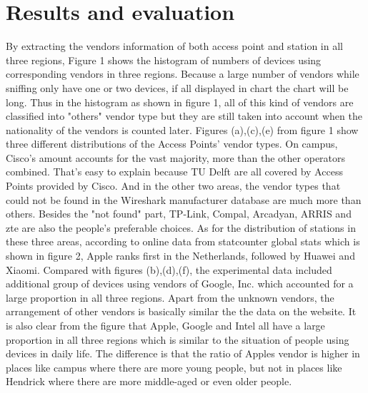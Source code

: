\section{Results and evaluation}

By extracting the vendors information of both access point and station in all three regions, Figure 1 shows the histogram of numbers of devices using corresponding vendors in three regions. Because a large number of vendors while sniffing only have one or two devices, if all displayed in chart the chart will be long. Thus in the histogram as shown in figure 1, all of this kind of vendors are classified into "others" vendor type but they are still taken into account when the nationality of the vendors is counted later.
\newline
Figures (a),(c),(e) from figure 1 show three different distributions of the Access Points' vendor types. On campus, Cisco's amount accounts for the vast majority, more than the other operators combined. That's easy to explain because TU Delft are all covered by Access Points provided by Cisco. And in the other two areas, the vendor types that could not be found in the Wireshark manufacturer database are much more than others. Besides the "not found" part, TP-Link, Compal, Arcadyan, ARRIS and zte are also the people's preferable choices.
\newline
As for the distribution of stations in these three areas,  according to online data from statcounter global stats which is shown in figure 2, Apple ranks first in the Netherlands, followed by Huawei and Xiaomi. Compared with figures (b),(d),(f), the experimental data included additional group of devices using vendors of Google, Inc. which accounted for a large proportion in all three regions. Apart from the unknown vendors, the arrangement of other vendors is basically similar the the data on the website. It is also clear from the figure that Apple, Google and Intel all have a large proportion in all three regions which is similar to the situation of people using devices in daily life. The difference is that the ratio of Apples vendor is higher in places like campus where there are more young people, but not in places like Hendrick where there are more middle-aged or even older people.

\newpage

